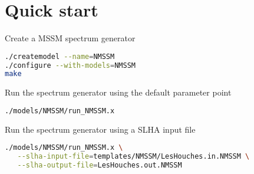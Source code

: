 \section{Quick start}
Create a MSSM spectrum generator
\begin{lstlisting}[language=bash]
./createmodel --name=NMSSM
./configure --with-models=NMSSM
make
\end{lstlisting}
Run the spectrum generator using the default parameter point
\begin{lstlisting}[language=bash]
./models/NMSSM/run_NMSSM.x
\end{lstlisting}
Run the spectrum generator using a SLHA input file
\begin{lstlisting}[language=bash]
./models/NMSSM/run_NMSSM.x \
   --slha-input-file=templates/NMSSM/LesHouches.in.NMSSM \
   --slha-output-file=LesHouches.out.NMSSM
\end{lstlisting}
